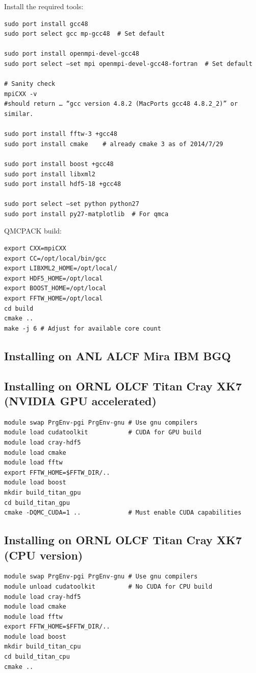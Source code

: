 Install the required tools:

\begin{verbatim} 
sudo port install gcc48
sudo port select gcc mp-gcc48  # Set default

sudo port install openmpi-devel-gcc48
sudo port select —set mpi openmpi-devel-gcc48-fortran  # Set default

# Sanity check
mpiCXX -v 
#should return … “gcc version 4.8.2 (MacPorts gcc48 4.8.2_2)” or similar.

sudo port install fftw-3 +gcc48
sudo port install cmake    # already cmake 3 as of 2014/7/29

sudo port install boost +gcc48
sudo port install libxml2
sudo port install hdf5-18 +gcc48

sudo port select —set python python27
sudo port install py27-matplotlib  # For qmca
\end{verbatim}

QMCPACK build:
\begin{verbatim}
export CXX=mpiCXX
export CC=/opt/local/bin/gcc
export LIBXML2_HOME=/opt/local/
export HDF5_HOME=/opt/local
export BOOST_HOME=/opt/local
export FFTW_HOME=/opt/local
cd build
cmake ..
make -j 6 # Adjust for available core count
\end{verbatim}

\subsection{Installing on ANL ALCF Mira IBM BGQ}

\subsection{Installing on ORNL OLCF Titan Cray XK7 (NVIDIA GPU
  accelerated)}
\begin{verbatim}
module swap PrgEnv-pgi PrgEnv-gnu # Use gnu compilers
module load cudatoolkit           # CUDA for GPU build
module load cray-hdf5
module load cmake
module load fftw
export FFTW_HOME=$FFTW_DIR/..
module load boost
mkdir build_titan_gpu
cd build_titan_gpu
cmake -DQMC_CUDA=1 ..             # Must enable CUDA capabilities
\end{verbatim}

\subsection{Installing on ORNL OLCF Titan Cray XK7 (CPU version)}
\begin{verbatim}
module swap PrgEnv-pgi PrgEnv-gnu # Use gnu compilers
module unload cudatoolkit         # No CUDA for CPU build
module load cray-hdf5
module load cmake
module load fftw
export FFTW_HOME=$FFTW_DIR/..
module load boost
mkdir build_titan_cpu
cd build_titan_cpu
cmake ..
\end{verbatim}

